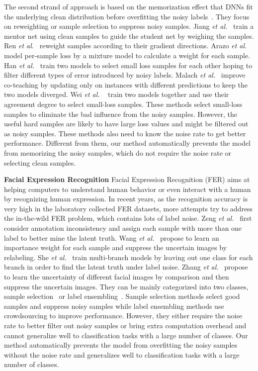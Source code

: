 \documentclass[runningheads]{llncs}
\begin{document}
The second strand of approach is based on the memorization effect that DNNs fit the underlying clean distribution before overfitting the noisy labels~\cite{arpit2017closer}. They focus on reweighting or sample selection to suppress noisy samples. Jiang \emph{et al.}~\cite{jiang2018mentornet} train a mentor net using clean samples to guide the student net by weighing the samples. Ren \emph{et al.}~\cite{ren2018learning} reweight samples according to their gradient directions. Arazo \emph{et al.}~\cite{arazo2019unsupervised} model per-sample loss by a mixture model to calculate a weight for each sample. Han \emph{et al.}~\cite{han2018co} train two models to select small loss samples for each other hoping to filter different types of error introduced by noisy labels. Malach \emph{et al.}~\cite{malach2017decoupling} improve co-teaching by updating only on instances with different predictions to keep the two models diverged. Wei \emph{et al.} ~\cite{wei2020combating} train two models together and use their agreement degree to select small-loss samples. These methods select small-loss samples to eliminate the bad influence from the noisy samples. However, the useful hard samples are likely to have large loss values and might be filtered out as noisy samples. These methods also need to know the noise rate to get better performance. Different from them, our method automatically prevents the model from memorizing the noisy samples, which do not require the noise rate or selecting clean samples.


\noindent\textbf{Facial Expression Recognition} Facial Expression Recognition (FER) aims at helping computers to understand human behavior or even interact with a human by recognizing human expression. In recent years, as the recognition accuracy is very high in the laboratory collected FER datasets, more attempts try to address the in-the-wild FER problem, which contains lots of label noise. Zeng \emph{et al.}~\cite{zeng2018facial} first consider annotation inconsistency and assign each sample with more than one label to better mine the latent truth. Wang \emph{et al.}~\cite{wang2020suppressing} propose to learn an importance weight for each sample and suppress the uncertain images by relabeling. She \emph{et al.}~\cite{she2021dive} train multi-branch models by leaving out one class for each branch in order to find the latent truth under label noise. Zhang \emph{et al.}~\cite{zhang2021relative} propose to learn the uncertainty of different facial images by comparison and then suppress the uncertain images. They can be mainly categorized into two classes, sample selection~\cite{wang2020suppressing, zhang2021relative} or label ensembling~\cite{zeng2018facial, she2021dive}. Sample selection methods select good samples and suppress noisy samples while label ensembling methods use crowdsourcing to improve performance. However, they either require the noise rate to better filter out noisy samples or bring extra computation overhead and cannot generalize well to classification tasks with a large number of classes. Our method automatically prevents the model from overfitting the noisy samples without the noise rate and generalizes well to classification tasks with a large number of classes.
\end{document}
